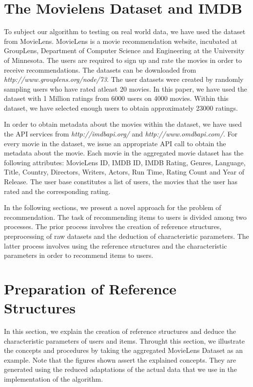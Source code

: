 \documentclass{acm_proc_article-sp}
\begin{document}
\section{The Movielens Dataset and IMDB}
\label{sec:dataset}
To subject our algorithm to testing on real world data, we have used the dataset from MovieLens. MovieLens is a movie recommendation website, incubated at GroupLens, Department of Computer Science and Engineering at the University of Minnesota. The users are required to sign up and rate the movies in order to receive recommendations. The datasets can be downloaded from\\ \emph{http://www.grouplens.org/node/73}. The user datasets were created by randomly sampling users who have rated atleast 20 movies. In this paper, we have used the dataset with 1 Million ratings from 6000 users on 4000 movies. Within this dataset, we have selected enough users to obtain approximately 23000 ratings.

In order to obtain metadata about the movies within the dataset, we have used the API services from \emph{http://imdbapi.org/} and \emph{http://www.omdbapi.com/}. For every movie in the dataset, we issue an appropriate API call to obtain the metadata about the movie. Each movie in the aggregated movie dataset has the following attributes: MovieLens ID, IMDB ID, IMDB Rating, Genres, Language, Title, Country, Directors, Writers, Actors, Run Time, Rating Count and Year of Release. The user base constitutes a list of users, the movies that the user has rated and the corresponding rating.

In the following sections, we present a novel approach for the problem of recommendation. The task of recommending items to users is divided among two processes. The prior process involves the creation of reference structures, preprocessing of raw datasets and the deduction of characteristic parameters. The latter process involves using the reference structures and the characteristic parameters in order to recommend items to users.

\section{Preparation of Reference Structures}
\label{sec:preparation}
In this section, we explain the creation of reference structures and deduce the characteristic parameters of users and items. Throught this section, we illustrate the concepts and procedures by taking the aggregated MovieLens Dataset as an example. Note that the figures shown assert the explained concepts. They are generated using the reduced adaptations of the actual data that we use in the implementation of the algorithm.
\end{document}
